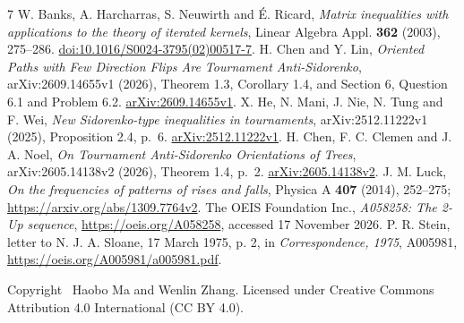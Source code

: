 \documentclass[11pt]{article}
\begin{document}
\begin{thebibliography}{7}
W. Banks, A. Harcharras, S. Neuwirth and \'E. Ricard,
\emph{Matrix inequalities with applications to the theory of iterated kernels},
Linear Algebra Appl. \textbf{362} (2003), 275--286.
\href{https://doi.org/10.1016/S0024-3795(02)00517-7}{doi:10.1016/S0024-3795(02)00517-7}.
H. Chen and Y. Lin,
\emph{Oriented Paths with Few Direction Flips Are Tournament Anti-Sidorenko},
arXiv:2609.14655v1 (2026), Theorem 1.3, Corollary 1.4, and Section 6,
Question 6.1 and Problem 6.2.
\href{https://arxiv.org/abs/2609.14655v1}{arXiv:2609.14655v1}.
X. He, N. Mani, J. Nie, N. Tung and F. Wei,
\emph{New Sidorenko-type inequalities in tournaments},
arXiv:2512.11222v1 (2025), Proposition 2.4, p.~6.
\href{https://arxiv.org/abs/2512.11222v1}{arXiv:2512.11222v1}.
H. Chen, F. C. Clemen and J. A. Noel,
\emph{On Tournament Anti-Sidorenko Orientations of Trees},
arXiv:2605.14138v2 (2026), Theorem 1.4, p.~2.
\href{https://arxiv.org/abs/2605.14138v2}{arXiv:2605.14138v2}.
J. M. Luck,
\emph{On the frequencies of patterns of rises and falls},
Physica A \textbf{407} (2014), 252--275;
\url{https://arxiv.org/abs/1309.7764v2}.
The OEIS Foundation Inc.,
\emph{A058258: The 2-Up sequence},
\url{https://oeis.org/A058258}, accessed 17 November 2026.
P. R. Stein, letter to N. J. A. Sloane, 17 March 1975, p. 2,
in \emph{Correspondence, 1975}, A005981,
\url{https://oeis.org/A005981/a005981.pdf}.
\end{thebibliography}
\bigskip
\noindent\small Copyright \textcopyright\ Haobo Ma and Wenlin Zhang.
Licensed under Creative Commons Attribution 4.0 International (CC BY 4.0).
\end{document}
